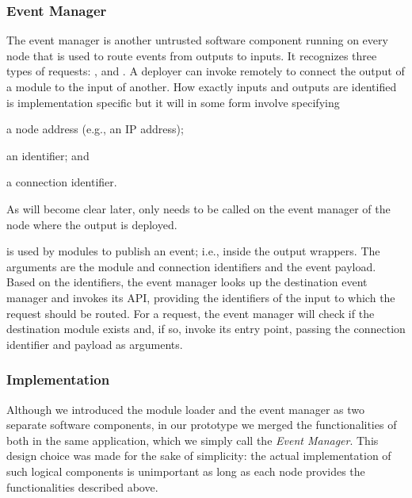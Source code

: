 \subsubsection{Event Manager} \label{concept:event-manager}
%
The event manager is another untrusted software component running on every
node that is used to route events from outputs to inputs.  It recognizes
three types of requests: \addconnection, \handlelocalevent{} and
\handleremoteevent.  A deployer can invoke \addconnection{} remotely to
connect the output of a module to the input of another.  How exactly inputs
and outputs are identified is implementation specific but it will in some
form involve specifying
%
\begin{paraenum}
%
  \item a node address (e.g., an IP address);
%
  \item an \protmod{} identifier; and
%
  \item a connection identifier.
%
\end{paraenum}
%
As will become clear later, \addconnection{} only needs to be called on the
event manager of the node where the output \reactmod{} is deployed.

\handlelocalevent{} is used by modules to publish an event; i.e., inside the
output wrappers. The arguments are the module and connection identifiers and the
event payload. Based on the identifiers, the event manager looks up the
destination event manager and invokes its \handleremoteevent{} API, providing
the identifiers of the input to which the request should be routed.  For a
\handleremoteevent{} request, the event manager will check if the destination
module exists and, if so, invoke its \handleinput{} entry point, passing the
connection identifier and payload as arguments.

\subsubsection{Implementation}
%
Although we introduced the module loader and the event manager as two separate
software components, in our prototype we merged the functionalities of both in
the same application, which we simply call the \emph{Event Manager}. This design
choice was made for the sake of simplicity: the actual implementation of such
logical components is unimportant as long as each node provides the
functionalities described above.

